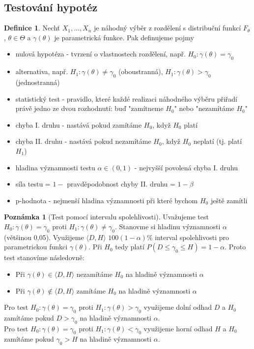 \documentclass[a4]{report}
\theoremstyle{definition}
\newtheorem{definition}{Definice}[section]
\newtheorem{notes}{Poznámka}[section]
\begin{document}
{\subsection{Testování hypotéz}
\begin{definition}
Nechť $X_1,\ldots,X_n$ je náhodný výběr z rozdělení s distribuční funkcí $F_{\theta}$, $\theta \in \Theta$ a $ \gamma \left(\theta \right)$ je parametrická funkce. Pak definujeme pojmy \begin{itemize}
\item nulová hypotéza - tvrzení o vlastnostech rozdělení, např. $H_0 : \gamma \left(\theta \right) = \gamma_0$
\item alternativa, např.  $H_1 : \gamma \left(\theta \right) \neq \gamma_0$ (oboustranná),  $H_1 : \gamma \left(\theta \right) > \gamma_0$ (jednostranná)
\item statistický test - pravidlo, které každé realizaci náhodného výběru přiřadí právě jedno ze dvou rozhodnutí: buď "zamítneme $H_0$" nebo "nezamítáme $H_0$"
\item chyba I. druhu - nastává pokud zamítáme $H_0$, když $H_0$ platí
\item chyba II. druhu - nastává pokud nezamítáme $H_0$, když $H_0$ neplatí (tj. platí $H_1$)
\item hladina významnosti testu $\alpha \in \left( 0,1 \right)$ - nejvyšší povolená chyba I. druhu
\item síla testu = $1 -$ pravděpodobnost chyby II. druhu = $1 - \beta$
\item p-hodnota - nejmenší hladina významnosti při které bychom $H_0$ ještě zamítli 
\end{itemize}
\end{definition}

\begin{notes}[Test pomocí intervalu spolehlivosti]
Uvažujeme test $H_0 : \gamma \left(\theta \right) = \gamma_0$ proti $H_1 : \gamma \left(\theta \right) \neq \gamma_0$. Stanovme si hladinu významnosti $\alpha$ (většinou 0,05). Využijeme $\langle D, H \rangle$ $100\left(1-\alpha \right)\%$ interval spolehlivosti pro parametrickou funkci $\gamma \left(\theta \right)$. Při $H_0$ tedy platí $P \left(D \leq \gamma_0 \leq H \right) = 1 - \alpha$. Proto test stanovíme následovně:\begin{itemize}
\item Při $\gamma \left(\theta \right) \in \langle D, H \rangle$ nezamítáme $H_0$ na hladině významnosti $\alpha$
\item Při $\gamma \left(\theta \right) \notin \langle D, H \rangle$ zamítáme $H_0$ na hladině významnosti $\alpha$
\end{itemize}
Pro test $H_0 : \gamma \left(\theta \right) = \gamma_0$ proti $H_1 : \gamma \left(\theta \right) > \gamma_0$ využijeme dolní odhad $D$ a $H_0$ zamítáme pokud $D > \gamma_0$ na hladině významnosti $\alpha$.\\
Pro test $H_0 : \gamma \left(\theta \right) = \gamma_0$ proti $H_1 : \gamma \left(\theta \right) < \gamma_0$ využijeme horní odhad $H$ a $H_0$ zamítáme pokud $\gamma_0 > H$ na hladině významnosti $\alpha$.
\end{notes}

}
\end{document}
